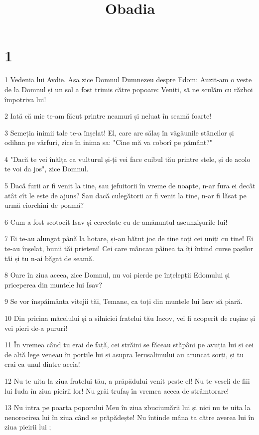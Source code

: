 

\title{Obadia}


\chapter{1}

\par 1 Vedenia lui Avdie. Așa zice Domnul Dumnezeu despre Edom: Auzit-am o veste de la Domnul și un sol a fost trimis către popoare: Veniți, să ne sculăm cu război împotriva lui!
\par 2 Iată că mic te-am făcut printre neamuri și neluat în seamă foarte!
\par 3 Semeția inimii tale te-a înșelat! El, care are sălaș în văgăunile stâncilor și odihna pe vârfuri, zice în inima sa: "Cine mă va coborî pe pământ?"
\par 4 "Dacă te vei înălța ca vulturul și-ți vei face cuibul tău printre stele, și de acolo te voi da jos", zice Domnul.
\par 5 Dacă furii ar fi venit la tine, sau jefuitorii în vreme de noapte, n-ar fura ei decât atât cît le este de ajuns? Sau dacă culegătorii ar fi venit la tine, n-ar fi lăsat pe urmă ciorchini de poamă?
\par 6 Cum a fost scotocit Isav și cercetate cu de-amănuntul ascunzișurile lui!
\par 7 Ei te-au alungat până la hotare, și-au bătut joc de tine toți cei uniți cu tine! Ei te-au înșelat, bunii tăi prieteni! Cei care mâncau pâinea ta îți întind curse pașilor tăi și tu n-ai băgat de seamă.
\par 8 Oare în ziua aceea, zice Domnul, nu voi pierde pe înțelepții Edomului și priceperea din muntele lui Isav?
\par 9 Se vor înspăimânta vitejii tăi, Temane, ca toți din muntele lui Isav să piară.
\par 10 Din pricina măcelului și a silniciei fratelui tău Iacov, vei fi acoperit de rușine și vei pieri de-a pururi!
\par 11 În vremea când tu erai de față, cei străini se făceau stăpâni pe avuția lui și cei de altă lege veneau în porțile lui și asupra Ierusalimului au aruncat sorți, și tu erai ca unul dintre aceia!
\par 12 Nu te uita la ziua fratelui tău, a prăpădului venit peste el! Nu te veseli de fiii lui Iuda în ziua pieirii lor! Nu grăi trufaș în vremea aceea de strâmtorare!
\par 13 Nu intra pe poarta poporului Meu în ziua zbuciumării lui și nici nu te uita la nenorocirea lui în ziua când se prăpădește! Nu întinde mâna ta către averea lui în ziua pieirii lui ;
